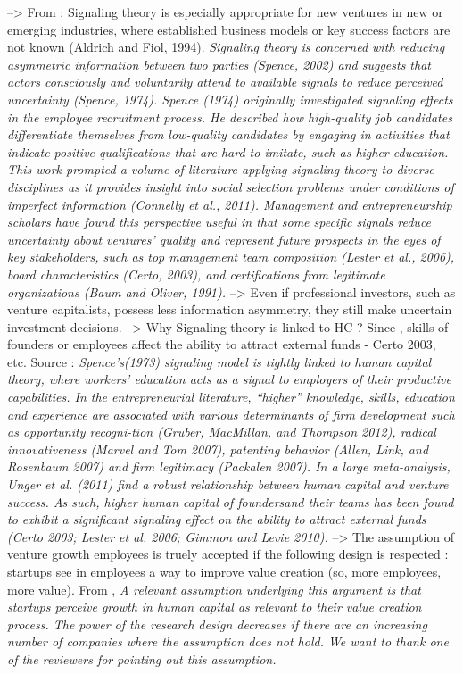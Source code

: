 \begin{itemize}
\begin{itemize}
\begin{itemize}
    --> From \citep{ko2018signaling} : Signaling theory is especially appropriate for new ventures in new or emerging industries, where established business models or key success factors are not known (Aldrich and Fiol, 1994). \textit{Signaling theory is concerned with reducing asymmetric information between two parties (Spence, 2002) and suggests that actors consciously and voluntarily attend to available signals to reduce perceived uncertainty (Spence, 1974). Spence (1974) originally investigated signaling effects in the employee recruitment process. He described how high-quality job candidates differentiate themselves from low-quality candidates by engaging in activities that indicate positive qualifications that are hard to imitate, such as higher education. This work prompted a volume of literature applying signaling theory to diverse disciplines as it provides insight into social selection problems under conditions of imperfect information (Connelly et al., 2011). Management and entrepreneurship scholars have found this perspective useful in that some specific signals reduce uncertainty about ventures' quality and represent future prospects in the eyes of key stakeholders, such as  top management team composition (Lester et al., 2006), board characteristics (Certo, 2003), and certifications from legitimate organizations (Baum and Oliver, 1991).} --> Even if professional investors, such as venture capitalists, possess less information asymmetry, they still make uncertain investment decisions.
    --> Why Signaling theory is linked to HC ? Since \citep{milosevic2020follow}, skills of founders or employees affect the ability to attract external funds - Certo 2003, etc. Source : \textit{Spence’s(1973) signaling model is tightly linked to human capital theory, where workers’ education acts as a signal to employers of their productive capabilities. In the entrepreneurial literature, “higher” knowledge, skills, education and experience are associated with various determinants of firm development such as opportunity recogni-tion (Gruber, MacMillan, and Thompson 2012), radical innovativeness (Marvel and Tom 2007), patenting behavior (Allen, Link, and Rosenbaum 2007) and firm legitimacy (Packalen 2007). In a large meta-analysis, Unger et al. (2011) find a robust relationship between human capital and venture success. As such, higher human capital of foundersand their teams has been found to exhibit a significant signaling effect on the ability to attract external funds (Certo 2003; Lester et al. 2006; Gimmon and Levie 2010).}
    --> The assumption of venture growth employees is truely accepted if the following design is respected : startups see in employees a way to improve value creation (so, more employees, more value). From \citet{davila2003venture}, \textit{A relevant assumption underlying this argument is that startups perceive growth in human capital as relevant to their value creation process. The power of the research design decreases if there are an increasing number of companies where the assumption does not hold. We want to thank one of the reviewers for pointing out this assumption.}

\end{itemize}
\end{itemize}
\end{itemize}
